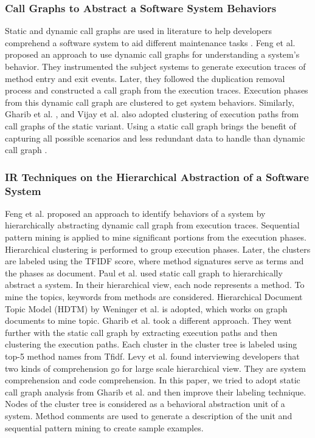\subsubsection{Call Graphs to Abstract a Software System Behaviors}

Static and dynamic call graphs are used in literature to help developers comprehend a software system to aid different maintenance tasks \cite{feng2018hierarchicalExecutionComprehension, gharibi2018automaticStaticCluster, xin2019identifyingFeaturesExecution}. Feng et al. \cite{feng2018hierarchicalExecutionComprehension} proposed an approach to use dynamic call graphs for understanding a system's behavior. They instrumented the subject systems to generate execution traces of method entry and exit events. Later, they followed the duplication removal process and constructed a call graph from the execution traces. Execution phases from this dynamic call graph are clustered to get system behaviors. Similarly, Gharib et al. \cite{gharibi2018automaticStaticCluster}, and Vijay et al. \cite{walunj2019graphevoEvolutionCall} also adopted clustering of execution paths from call graphs of the static variant. Using a static call graph brings the benefit of capturing all possible scenarios and less redundant data to handle than dynamic call graph \cite{gharibi2018automaticStaticCluster}. 

\subsubsection{IR Techniques on the Hierarchical Abstraction of a Software System}
Feng et al. \cite{feng2018hierarchicalExecutionComprehension} proposed an approach to identify behaviors of a system by hierarchically abstracting dynamic call graph from execution traces. Sequential pattern mining is applied to mine significant portions from the execution phases. Hierarchical clustering is performed to group execution phases. Later, the clusters are labeled using the TFIDF score, where method signatures serve as terms and the phases as document. 
Paul et al. \cite{mcburney2014improvingTopicSummarize} used static call graph to hierarchically abstract a system. In their hierarchical view, each node represents a method. To mine the topics, keywords from methods are considered. Hierarchical Document Topic Model (HDTM) by \cite{weninger2012documentTopicHierarchies} Weninger et al. is adopted, which works on graph documents to mine topic. Gharib et al. \cite{gharibi2018automaticStaticCluster} took a different approach. They went further with the static call graph by extracting execution paths and then clustering the execution paths. Each cluster in the cluster tree is labeled using top-5 method names from Tfidf. Levy et al. \cite{levy2019understandingLargeHierarchical} found interviewing developers that two kinds of comprehension go for large scale hierarchical view. They are system comprehension and code comprehension. In this paper, we tried to adopt static call graph analysis from Gharib et al. and then improve their labeling technique. Nodes of the cluster tree is considered as a behavioral abstraction unit of a system. Method comments are used to generate a description of the unit and sequential pattern mining to create sample examples. 


